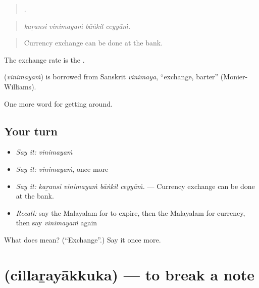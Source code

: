 \begin{quote}
   .
\end{quote}

\begin{quote}
\emph{kaṟansi vinimayaṁ bāṅkil ceyyāṁ.}
\end{quote}

\begin{quote}
Currency exchange can be done at the bank.
\end{quote}

The exchange rate is the  .

\begin{cousinweb}
\textbf{} (\emph{vinimayaṁ}) is borrowed from Sanskrit \emph{vinimaya}, \textquotedblleft{}exchange, barter\textquotedblright{} (Monier-Williams).
\end{cousinweb}

\begin{grammarlens}[title={What you've built}]
One more word for getting around.
\end{grammarlens}

\subsection*{Your turn}
\begin{itemize}
\raggedright
  \item \emph{Say it:} \emph{vinimayaṁ}
  \item \emph{Say it:} \emph{vinimayaṁ}, once more
  \item \emph{Say it:} \emph{kaṟansi vinimayaṁ bāṅkil ceyyāṁ.} — Currency exchange can be done at the bank.
  \item \emph{Recall:} say the Malayalam for to expire, then the Malayalam for currency, then say \emph{vinimayaṁ} again
\end{itemize}

\begin{tcolorbox}[breakable,colback=teal!4,colframe=teal!35!black,title={Before you move on}]
What does  mean? (\textquotedblleft{}Exchange\textquotedblright{}.) Say it once more.
\end{tcolorbox}
\section[\texorpdfstring{\ml{ചില്ലറയാക്കുക} (cillaṟayākkuka)}{ചില്ലറയാക്കുക (cillaṟayākkuka)}]{ (cillaṟayākkuka) — to break a note}

